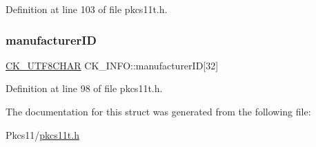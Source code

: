 Definition at line 103 of file pkcs11t.\+h.

\mbox{\label{struct_c_k___i_n_f_o_ab58e8e4d98ad72aaaa59cad2cc85ea80}} 
\subsubsection{\texorpdfstring{manufacturer\+ID}{manufacturerID}}
{\footnotesize\ttfamily \hyperlink{pkcs11t_8h_a0b0f8118c33f8a96a6af834bbab1df0c}{C\+K\+\_\+\+U\+T\+F8\+C\+H\+AR} C\+K\+\_\+\+I\+N\+F\+O\+::manufacturer\+ID\mbox{[}32\mbox{]}}



Definition at line 98 of file pkcs11t.\+h.



The documentation for this struct was generated from the following file\+:\begin{DoxyCompactItemize}
\item 
Pkcs11/\hyperlink{pkcs11t_8h}{pkcs11t.\+h}\end{DoxyCompactItemize}

